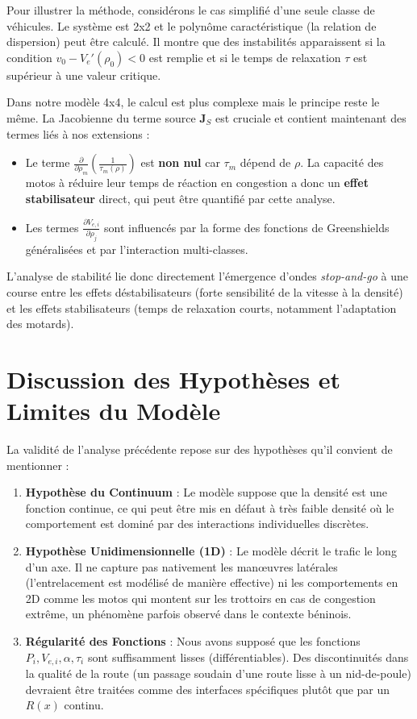 Pour illustrer la méthode, considérons le cas simplifié d'une seule classe de véhicules. Le système est 2x2 et le polynôme caractéristique (la relation de dispersion) peut être calculé. Il montre que des instabilités apparaissent si la condition $v_0 - V_{e}'(\rho_0) < 0$ est remplie et si le temps de relaxation $\tau$ est supérieur à une valeur critique.

Dans notre modèle 4x4, le calcul est plus complexe mais le principe reste le même. La Jacobienne du terme source $\mathbf{J}_S$ est cruciale et contient maintenant des termes liés à nos extensions :
\begin{itemize}
    \item Le terme $\frac{\partial}{\partial \rho_m}(\frac{1}{\tau_m(\rho)})$ est \textbf{non nul} car $\tau_m$ dépend de $\rho$. La capacité des motos à réduire leur temps de réaction en congestion a donc un \textbf{effet stabilisateur} direct, qui peut être quantifié par cette analyse.
    \item Les termes $\frac{\partial V_{e,i}}{\partial \rho_j}$ sont influencés par la forme des fonctions de Greenshields généralisées et par l'interaction multi-classes.
\end{itemize}

L'analyse de stabilité lie donc directement l'émergence d'ondes \textit{stop-and-go} à une course entre les effets déstabilisateurs (forte sensibilité de la vitesse à la densité) et les effets stabilisateurs (temps de relaxation courts, notamment l'adaptation des motards).

\section{Discussion des Hypothèses et Limites du Modèle}
La validité de l'analyse précédente repose sur des hypothèses qu'il convient de mentionner :
\begin{enumerate}
    \item \textbf{Hypothèse du Continuum} : Le modèle suppose que la densité est une fonction continue, ce qui peut être mis en défaut à très faible densité où le comportement est dominé par des interactions individuelles discrètes.
    \item \textbf{Hypothèse Unidimensionnelle (1D)} : Le modèle décrit le trafic le long d'un axe. Il ne capture pas nativement les manœuvres latérales (l'entrelacement est modélisé de manière effective) ni les comportements en 2D comme les motos qui montent sur les trottoirs en cas de congestion extrême, un phénomène parfois observé dans le contexte béninois.
    \item \textbf{Régularité des Fonctions} : Nous avons supposé que les fonctions $P_i, V_{e,i}, \alpha, \tau_i$ sont suffisamment lisses (différentiables). Des discontinuités dans la qualité de la route (un passage soudain d'une route lisse à un nid-de-poule) devraient être traitées comme des interfaces spécifiques plutôt que par un $R(x)$ continu.
\end{enumerate}

